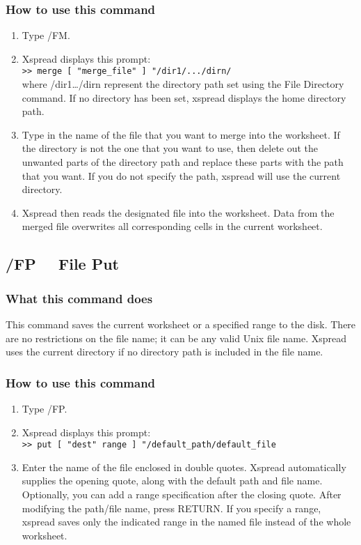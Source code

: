 \subsubsection*{How to use this command}
\begin{enumerate}
\item{Type /FM.}
\item{Xspread displays this prompt:\\
        \verb|>> merge [ "merge_file" ] "/dir1/.../dirn/|\\
        where /dir1\ldots /dirn represent the directory path set using the
        File Directory command.  If no directory has been set, xspread
        displays the home directory path. }
\item{Type in the name of the file that you want to merge into the
        worksheet.  If the directory is not the one that you want to use,
        then delete out the unwanted parts
        of the directory path and replace these parts with the path that
        you want.  If you do not specify the path, xspread will use the
        current directory. }
\item{Xspread then reads the designated file into the worksheet.  Data
        from the merged file overwrites all corresponding cells in the
        current worksheet.}
\end{enumerate}
        
\subsection*{/FP \ \     File Put}

\subsubsection*{What this command does}
This command saves the current worksheet or a specified range to the 
disk.  There are no restrictions on the file name; it can be any valid 
Unix file name.  Xspread uses the current directory if no directory 
path is included in the file name.

\subsubsection*{How to use this command}
\begin{enumerate}
\item{Type /FP.}
\item{Xspread displays this prompt:\\
	\verb|>> put [ "dest" range ] "/default_path/default_file|\\}
\item{Enter the name of the file enclosed in double quotes.  Xspread
        automatically supplies the opening quote, along with the default
	path and file name.  Optionally, you can add
        a range specification after the closing quote.  After modifying
        the path/file name, press RETURN.  If you specify a range, xspread
        saves only the indicated range in the named file instead of the
        whole worksheet.}
\end{enumerate}
        
